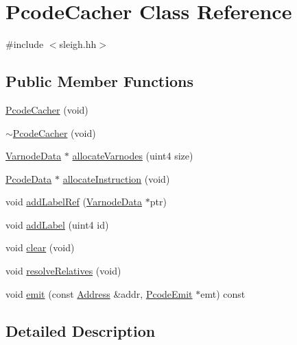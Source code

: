 \hypertarget{class_pcode_cacher}{}\section{Pcode\+Cacher Class Reference}
\label{class_pcode_cacher}


{\ttfamily \#include $<$sleigh.\+hh$>$}

\subsection*{Public Member Functions}
\begin{DoxyCompactItemize}
\item 
\mbox{\hyperlink{class_pcode_cacher_ab165af5d7b6e70864878b6c481b3c7ee}{Pcode\+Cacher}} (void)
\item 
\mbox{\hyperlink{class_pcode_cacher_a9c5967c5d408d69a7b0cabe9897a7d42}{$\sim$\+Pcode\+Cacher}} (void)
\item 
\mbox{\hyperlink{struct_varnode_data}{Varnode\+Data}} $\ast$ \mbox{\hyperlink{class_pcode_cacher_adea4c5effe401cd5d08eafa7dcf7940d}{allocate\+Varnodes}} (uint4 size)
\item 
\mbox{\hyperlink{struct_pcode_data}{Pcode\+Data}} $\ast$ \mbox{\hyperlink{class_pcode_cacher_aa29fd61027450c899c91b11bbca180d3}{allocate\+Instruction}} (void)
\item 
void \mbox{\hyperlink{class_pcode_cacher_a41cbff0ce922ff8b8d18c396c63a3157}{add\+Label\+Ref}} (\mbox{\hyperlink{struct_varnode_data}{Varnode\+Data}} $\ast$ptr)
\item 
void \mbox{\hyperlink{class_pcode_cacher_a0c78362135eeb99f2b1acef6615c3428}{add\+Label}} (uint4 id)
\item 
void \mbox{\hyperlink{class_pcode_cacher_afa7aaee06ffc63d4200619c52728181e}{clear}} (void)
\item 
void \mbox{\hyperlink{class_pcode_cacher_a43bb71389841843cc69d3a36d46674f1}{resolve\+Relatives}} (void)
\item 
void \mbox{\hyperlink{class_pcode_cacher_a75c21a233c9eef255c53a498790882fc}{emit}} (const \mbox{\hyperlink{class_address}{Address}} \&addr, \mbox{\hyperlink{class_pcode_emit}{Pcode\+Emit}} $\ast$emt) const
\end{DoxyCompactItemize}


\subsection{Detailed Description}


